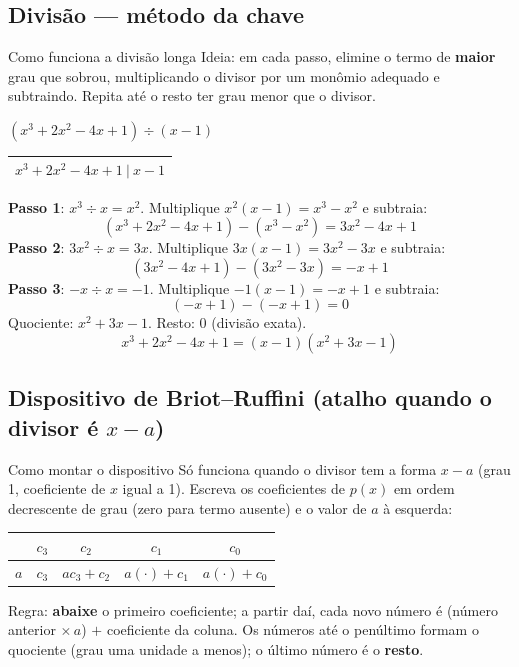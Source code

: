 \documentclass[12pt,a4paper]{article}
\begin{document}
\subsection{Divisão — método da chave}

\begin{dica}{Como funciona a divisão longa}
Ideia: em cada passo, elimine o termo de \textbf{maior} grau que sobrou,
multiplicando o divisor por um monômio adequado e subtraindo. Repita até o
resto ter grau menor que o divisor.
\end{dica}

\begin{exemplo}{$(x^3+2x^2-4x+1)\div(x-1)$}
\begin{center}
\renewcommand{\arraystretch}{1.3}
\begin{tabular}{r}
$x^3+2x^2-4x+1 \ \big|\ x-1$\\
\hline
\end{tabular}
\end{center}
\textbf{Passo 1}: $x^3 \div x = x^2$. Multiplique $x^2(x-1)=x^3-x^2$ e subtraia:
\[
(x^3+2x^2-4x+1) - (x^3-x^2) = 3x^2-4x+1
\]
\textbf{Passo 2}: $3x^2\div x = 3x$. Multiplique $3x(x-1)=3x^2-3x$ e subtraia:
\[
(3x^2-4x+1)-(3x^2-3x) = -x+1
\]
\textbf{Passo 3}: $-x\div x=-1$. Multiplique $-1(x-1)=-x+1$ e subtraia:
\[
(-x+1)-(-x+1) = 0
\]
Quociente: $x^2+3x-1$. Resto: $0$ (divisão exata).
\[
x^3+2x^2-4x+1 = (x-1)(x^2+3x-1)
\]
\end{exemplo}

\subsection{Dispositivo de Briot--Ruffini (atalho quando o divisor é $x-a$)}

\begin{definicao}{Como montar o dispositivo}
Só funciona quando o divisor tem a forma $x-a$ (grau 1, coeficiente de $x$
igual a 1). Escreva os coeficientes de $p(x)$ em ordem decrescente de grau
(zero para termo ausente) e o valor de $a$ à esquerda:
\begin{center}
\begin{tabular}{c|cccc}
 & $c_3$ & $c_2$ & $c_1$ & $c_0$\\
\hline
$a$ & $c_3$ & $a c_3+c_2$ & $a(\cdot)+c_1$ & $a(\cdot)+c_0$
\end{tabular}
\end{center}
Regra: \textbf{abaixe} o primeiro coeficiente; a partir daí, cada novo
número é (número anterior $\times\, a$) $+$ coeficiente da coluna. Os
números até o penúltimo formam o quociente (grau uma unidade a menos); o
último número é o \textbf{resto}.
\end{definicao}
\end{document}
